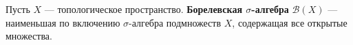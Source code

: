 \label{definition:19}

\begin{definition}
Пусть $X$ --- топологическое пространство.
\textbf{Борелевская $\sigma$-алгебра} $\mathcal B(X)$ --- наименьшая по включению $\sigma$-алгебра подмножеств $X$, содержащая все открытые множества.
\end{definition}
